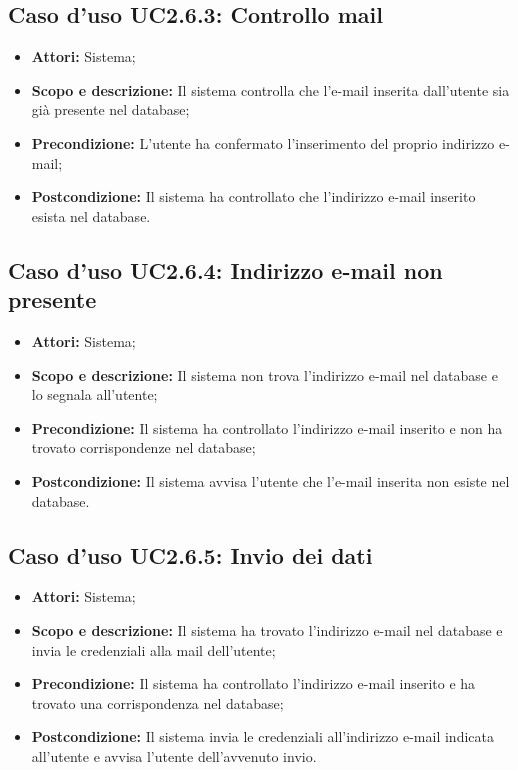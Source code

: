 \subsection{Caso d'uso UC2.6.3: Controllo mail}
\begin{itemize}
	\item \textbf{Attori:} Sistema;
	\item \textbf{Scopo e descrizione:} Il sistema controlla che l'e-mail inserita dall'utente sia già presente nel \gls{database};
	\item \textbf{Precondizione:} L'utente ha confermato l'inserimento del proprio indirizzo e-mail;
	\item \textbf{Postcondizione:} Il sistema ha controllato che l'indirizzo e-mail inserito esista nel \gls{database}.
\end{itemize}

\subsection{Caso d'uso UC2.6.4: Indirizzo e-mail non presente}
\begin{itemize}
	\item \textbf{Attori:} Sistema;
	\item \textbf{Scopo e descrizione:} Il sistema non trova l'indirizzo e-mail nel \gls{database} e lo segnala all'utente;
	\item \textbf{Precondizione:} Il sistema ha controllato l'indirizzo e-mail inserito e non ha trovato corrispondenze nel \gls{database};
	\item \textbf{Postcondizione:} Il sistema avvisa l'utente che l'e-mail inserita non esiste nel \gls{database}.
\end{itemize}

\subsection{Caso d'uso UC2.6.5: Invio dei dati}
\begin{itemize}
	\item \textbf{Attori:} Sistema;
	\item \textbf{Scopo e descrizione:} Il sistema ha trovato l'indirizzo e-mail nel \gls{database} e invia le credenziali alla mail dell'utente;
	\item \textbf{Precondizione:} Il sistema ha controllato l'indirizzo e-mail inserito e ha trovato una corrispondenza nel \gls{database};
	\item \textbf{Postcondizione:} Il sistema invia le credenziali all'indirizzo e-mail indicata all'utente e avvisa l'utente dell'avvenuto invio.
\end{itemize}

